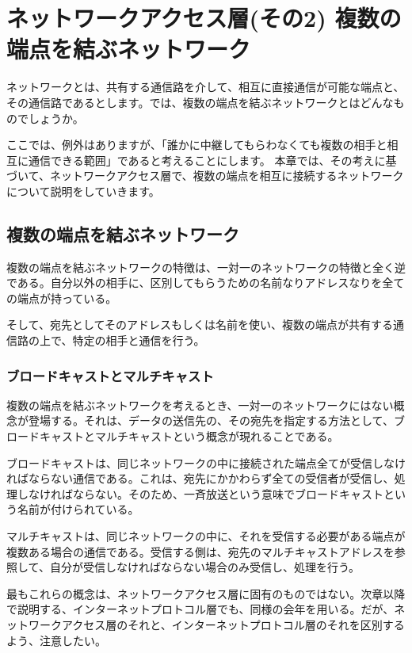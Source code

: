 \chapter{ネットワークアクセス層(その2) 複数の端点を結ぶネットワーク}



ネットワークとは、共有する通信路を介して、相互に直接通信が可能な端点と、その通信路であるとします。では、複数の端点を結ぶネットワークとはどんなものでしょうか。

ここでは、例外はありますが、「誰かに中継してもらわなくても複数の相手と相互に通信できる範囲」であると考えることにします。
本章では、その考えに基づいて、ネットワークアクセス層で、複数の端点を相互に接続するネットワークについて説明をしていきます。


\section{複数の端点を結ぶネットワーク}
複数の端点を結ぶネットワークの特徴は、一対一のネットワークの特徴と全く逆である。自分以外の相手に、区別してもらうための名前なりアドレスなりを全ての端点が持っている。

そして、宛先としてそのアドレスもしくは名前を使い、複数の端点が共有する通信路の上で、特定の相手と通信を行う。

\subsection{ブロードキャストとマルチキャスト}
複数の端点を結ぶネットワークを考えるとき、一対一のネットワークにはない概念が登場する。それは、データの送信先の、その宛先を指定する方法として、ブロードキャストとマルチキャストという概念が現れることである。

ブロードキャストは、同じネットワークの中に接続された端点全てが受信しなければならない通信である。これは、宛先にかかわらず全ての受信者が受信し、処理しなければならない。そのため、一斉放送という意味でブロードキャストという名前が付けられている。

マルチキャストは、同じネットワークの中に、それを受信する必要がある端点が複数ある場合の通信である。受信する側は、宛先のマルチキャストアドレスを参照して、自分が受信しなければならない場合のみ受信し、処理を行う。

最もこれらの概念は、ネットワークアクセス層に固有のものではない。次章以降で説明する、インターネットプロトコル層でも、同様の会年を用いる。だが、ネットワークアクセス層のそれと、インターネットプロトコル層のそれを区別するよう、注意したい。

